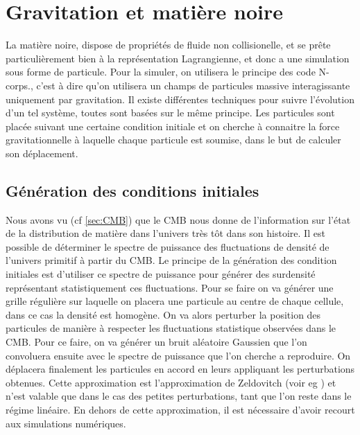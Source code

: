 \section{Gravitation et matière noire}
\label{sec:solverDM}
La matière noire, dispose de propriétés de fluide non collisionelle, et se prête particulièrement bien à la représentation Lagrangienne, et donc a une simulation sous forme de particule.
Pour la simuler, on utilisera le principe des code N-corps., c'est à dire qu'on utilisera un champs de particules massive interagissante uniquement par gravitation.
Il existe différentes techniques pour suivre l'évolution d'un tel système, toutes sont basées sur le même principe.
Les particules sont placée suivant une certaine condition initiale et on cherche à connaitre la force gravitationnelle à laquelle chaque particule est soumise, dans le but de calculer son déplacement.

\subsection{Génération des conditions initiales}
\label{sec:IC}
Nous avons vu (cf \ref{sec:CMB}) que le \ac{CMB} nous donne de l'information sur l'état de la distribution de matière dans l'univers très tôt dans son histoire.
Il est possible de déterminer le spectre de puissance des fluctuations de densité de l'univers primitif à partir du \ac{CMB}.
Le principe de la génération des condition initiales est d'utiliser ce spectre de puissance pour générer des surdensité représentant statistiquement ces fluctuations.
Pour se faire on va générer une grille régulière sur laquelle on placera une particule au centre de chaque cellule, dans ce cas la densité est homogène.
On va alors perturber la position des particules de manière à respecter les fluctuations statistique observées dans le \ac{CMB}.
Pour ce faire, on va générer un bruit aléatoire Gaussien que l'on 
convoluera ensuite avec le spectre de puissance que l'on cherche a reproduire.
On déplacera finalement les particules en accord en leurs appliquant les perturbations obtenues. 
Cette approximation est l’approximation de Zeldovitch (voir eg \cite{2014MNRAS.439.3630W}) et n'est valable que dans le cas des petites perturbations, tant que l'on reste dans le régime linéaire.
En dehors de cette approximation, il est nécessaire d'avoir recourt aux simulations numériques.

